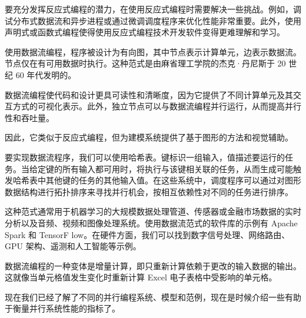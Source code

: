 要充分发挥反应式编程的潜力，在使用反应式编程时需要解决一些挑战。例如，调试分布式数据流和异步进程或通过微调调度程序来优化性能非常重要。此外，使用声明式或函数式编程使得使用反应式编程技术开发软件变得更难理解和学习。


使用数据流编程，程序被设计为有向图，其中节点表示计算单元，边表示数据流。节点仅在有可用数据时执行。这种范式是由麻省理工学院的杰克·丹尼斯于 20 世纪 60 年代发明的。

数据流编程使代码和设计更具可读性和清晰度，因为它提供了不同计算单元及其交互方式的可视化表示。此外，独立节点可以与数据流编程并行运行，从而提高并行性和吞吐量。

因此，它类似于反应式编程，但为建模系统提供了基于图形的方法和视觉辅助。

要实现数据流程序，我们可以使用哈希表。键标识一组输入，值描述要运行的任务。当给定键的所有输入都可用时，将执行与该键相关联的任务，从而生成可能触发哈希表中其他键的任务的其他输入值。在这些系统中，调度程序可以通过对图形数据结构进行拓扑排序来寻找并行机会，按相互依赖性对不同的任务进行排序。

这种范式通常用于机器学习的大规模数据处理管道、传感器或金融市场数据的实时分析以及音频、视频和图像处理系统。使用数据流范式的软件库的示例有 Apache Spark 和 TensorF low。在硬件方面，我们可以找到数字信号处理、网络路由、 GPU 架构、遥测和人工智能等示例。

数据流编程的一种变体是增量计算，即只重新计算依赖于更改的输入数据的输出。这就像当单元格值发生变化时重新计算 Excel 电子表格中受影响的单元格。

现在我们已经了解了不同的并行编程系统、模型和范例，现在是时候介绍一些有助于衡量并行系统性能的指标了。


